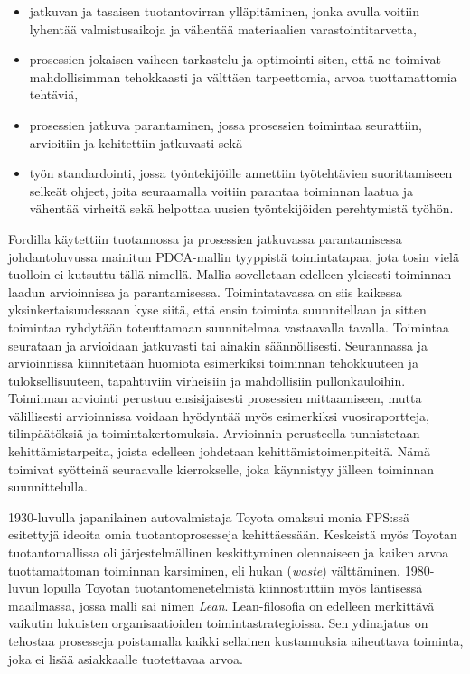 \documentclass[
  finnish,
  letterpaper,
  DIV=11,
  numbers=noendperiod,
  oneside]{scrreprt}
\providecommand{\tightlist}{%
  \setlength{\itemsep}{0pt}\setlength{\parskip}{0pt}}
\begin{document}
\begin{itemize}
\tightlist
\item
  jatkuvan ja tasaisen tuotantovirran ylläpitäminen, jonka avulla
  voitiin lyhentää valmistusaikoja ja vähentää materiaalien
  varastointitarvetta,
\item
  prosessien jokaisen vaiheen tarkastelu ja optimointi siten, että ne
  toimivat mahdollisimman tehokkaasti ja välttäen tarpeettomia, arvoa
  tuottamattomia tehtäviä,
\item
  prosessien jatkuva parantaminen, jossa prosessien toimintaa
  seurattiin, arvioitiin ja kehitettiin jatkuvasti sekä
\item
  työn standardointi, jossa työntekijöille annettiin työtehtävien
  suorittamiseen selkeät ohjeet, joita seuraamalla voitiin parantaa
  toiminnan laatua ja vähentää virheitä sekä helpottaa uusien
  työntekijöiden perehtymistä työhön.
\end{itemize}

Fordilla käytettiin tuotannossa ja prosessien jatkuvassa parantamisessa
johdantoluvussa mainitun PDCA-mallin tyyppistä toimintatapaa, jota tosin
vielä tuolloin ei kutsuttu tällä nimellä. Mallia sovelletaan edelleen
yleisesti toiminnan laadun arvioinnissa ja parantamisessa.
Toimintatavassa on siis kaikessa yksinkertaisuudessaan kyse siitä, että
ensin toiminta suunnitellaan ja sitten toimintaa ryhdytään toteuttamaan
suunnitelmaa vastaavalla tavalla. Toimintaa seurataan ja arvioidaan
jatkuvasti tai ainakin säännöllisesti. Seurannassa ja arvioinnissa
kiinnitetään huomiota esimerkiksi toiminnan tehokkuuteen ja
tuloksellisuuteen, tapahtuviin virheisiin ja mahdollisiin
pullonkauloihin. Toiminnan arviointi perustuu ensisijaisesti prosessien
mittaamiseen, mutta välillisesti arvioinnissa voidaan hyödyntää myös
esimerkiksi vuosiraportteja, tilinpäätöksiä ja toimintakertomuksia.
Arvioinnin perusteella tunnistetaan kehittämistarpeita, joista edelleen
johdetaan kehittämistoimenpiteitä. Nämä toimivat syötteinä seuraavalle
kierrokselle, joka käynnistyy jälleen toiminnan suunnittelulla.

1930-luvulla japanilainen autovalmistaja Toyota omaksui monia FPS:ssä
esitettyjä ideoita omia tuotantoprosesseja kehittäessään. Keskeistä myös
Toyotan tuotantomallissa oli järjestelmällinen keskittyminen olennaiseen
ja kaiken arvoa tuottamattoman toiminnan karsiminen, eli hukan
(\emph{waste}) välttäminen. 1980-luvun lopulla Toyotan
tuotantomenetelmistä kiinnostuttiin myös läntisessä maailmassa, jossa
malli sai nimen \emph{Lean}. Lean-filosofia on edelleen merkittävä
vaikutin lukuisten organisaatioiden toimintastrategioissa. Sen
ydinajatus on tehostaa prosesseja poistamalla kaikki sellainen
kustannuksia aiheuttava toiminta, joka ei lisää asiakkaalle tuotettavaa
arvoa.
\end{document}
